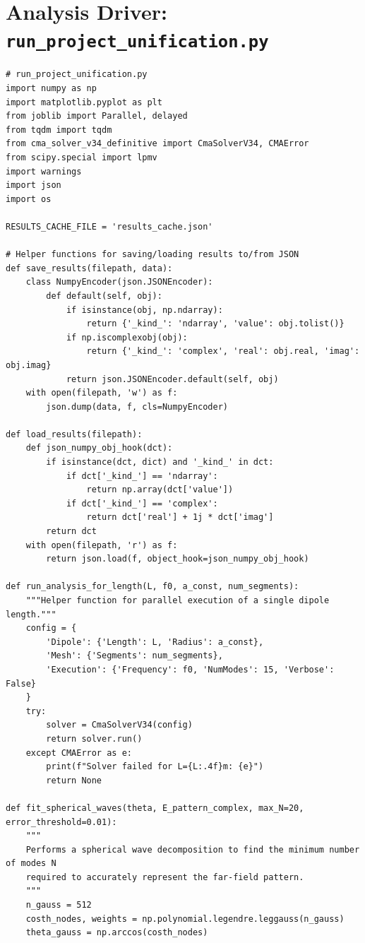 \documentclass[11pt, a4paper]{report}
\begin{document}
\section{Analysis Driver: \texttt{run\_project\_unification.py}}
\begin{lstlisting}[caption={Driver script for the Unification Analysis.}, label={lst:run_unification}]
# run_project_unification.py
import numpy as np
import matplotlib.pyplot as plt
from joblib import Parallel, delayed
from tqdm import tqdm
from cma_solver_v34_definitive import CmaSolverV34, CMAError
from scipy.special import lpmv
import warnings
import json
import os

RESULTS_CACHE_FILE = 'results_cache.json'

# Helper functions for saving/loading results to/from JSON
def save_results(filepath, data):
    class NumpyEncoder(json.JSONEncoder):
        def default(self, obj):
            if isinstance(obj, np.ndarray):
                return {'_kind_': 'ndarray', 'value': obj.tolist()}
            if np.iscomplexobj(obj):
                return {'_kind_': 'complex', 'real': obj.real, 'imag': obj.imag}
            return json.JSONEncoder.default(self, obj)
    with open(filepath, 'w') as f:
        json.dump(data, f, cls=NumpyEncoder)

def load_results(filepath):
    def json_numpy_obj_hook(dct):
        if isinstance(dct, dict) and '_kind_' in dct:
            if dct['_kind_'] == 'ndarray':
                return np.array(dct['value'])
            if dct['_kind_'] == 'complex':
                return dct['real'] + 1j * dct['imag']
        return dct
    with open(filepath, 'r') as f:
        return json.load(f, object_hook=json_numpy_obj_hook)

def run_analysis_for_length(L, f0, a_const, num_segments):
    """Helper function for parallel execution of a single dipole length."""
    config = {
        'Dipole': {'Length': L, 'Radius': a_const},
        'Mesh': {'Segments': num_segments},
        'Execution': {'Frequency': f0, 'NumModes': 15, 'Verbose': False}
    }
    try:
        solver = CmaSolverV34(config)
        return solver.run()
    except CMAError as e:
        print(f"Solver failed for L={L:.4f}m: {e}")
        return None

def fit_spherical_waves(theta, E_pattern_complex, max_N=20, error_threshold=0.01):
    """
    Performs a spherical wave decomposition to find the minimum number of modes N
    required to accurately represent the far-field pattern.
    """
    n_gauss = 512
    costh_nodes, weights = np.polynomial.legendre.leggauss(n_gauss)
    theta_gauss = np.arccos(costh_nodes)
    

\end{lstlisting}
\end{document}
